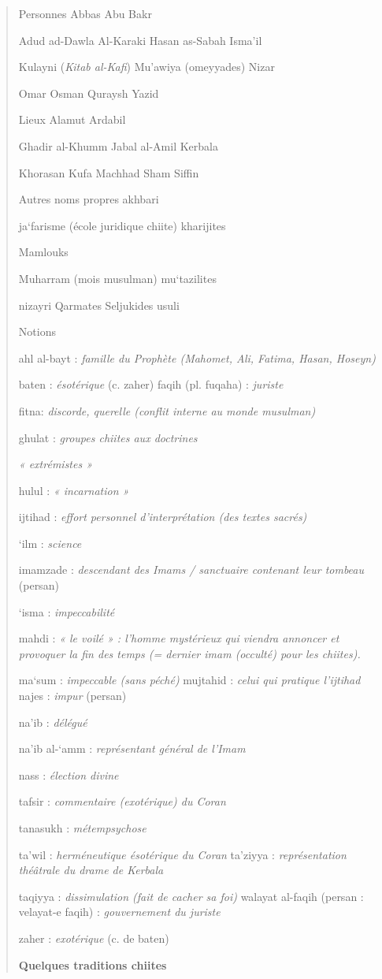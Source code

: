 \begin{quote}
{Personnes} Abbas Abu Bakr

Adud ad-Dawla Al-Karaki Hasan as-Sabah Isma'il

Kulayni (\emph{Kitab al-Kafi}) Mu'awiya (omeyyades) Nizar

Omar Osman Quraysh Yazid

{Lieux} Alamut Ardabil

Ghadir al-Khumm Jabal al-Amil Kerbala

Khorasan Kufa Machhad Sham Siffin

{Autres noms propres} akhbari

ja`farisme (école juridique chiite) kharijites

Mamlouks

Muharram (mois musulman) mu`tazilites

nizayri Qarmates Seljukides usuli

{Notions}

ahl al-bayt : \emph{famille du Prophète (Mahomet, Ali, Fatima, Hasan,
Hoseyn)}

baten : \emph{ésotérique} (c. zaher) faqih (pl. fuqaha) : \emph{juriste}

fitna: \emph{discorde, querelle (conflit interne au monde musulman)}

ghulat : \emph{groupes chiites aux doctrines}

\emph{« extrémistes »}

hulul : \emph{« incarnation »}

ijtihad : \emph{effort personnel d'interprétation (des textes sacrés)}

`ilm : \emph{science}

imamzade : \emph{descendant des Imams / sanctuaire contenant leur
tombeau} (persan)

`isma : \emph{impeccabilité}

mahdi : \emph{« le voilé » : l'homme mystérieux qui viendra annoncer et
provoquer la fin des temps (= dernier imam (occulté) pour les chiites).}

ma`sum : \emph{impeccable (sans péché)} mujtahid : \emph{celui qui
pratique l'ijtihad} najes : \emph{impur} (persan)

na'ib : \emph{délégué}

na'ib al-`amm : \emph{représentant général de l'Imam}

nass : \emph{élection divine}

tafsir : \emph{commentaire (exotérique) du Coran}

tanasukh : \emph{métempsychose}

ta'wil : \emph{herméneutique ésotérique du Coran} ta'ziyya :
\emph{représentation théâtrale du drame de Kerbala}

taqiyya : \emph{dissimulation (fait de cacher sa foi)} walayat al-faqih
(persan : velayat-e faqih) : \emph{gouvernement du juriste}

zaher : \emph{exotérique} (c. de baten)

\textbf{{Quelques traditions chiites}}
\end{quote}

